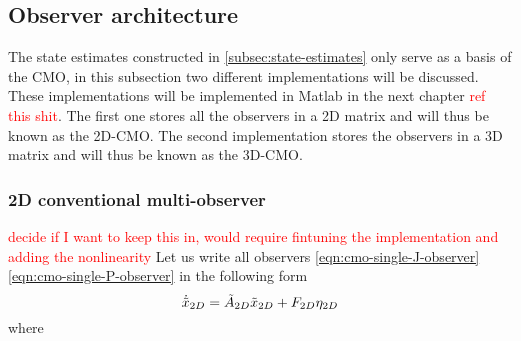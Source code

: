 \subsection{Observer architecture}\label{subsec:CMO-architecture}
The state estimates constructed in \ref{subsec:state-estimates} only serve as a basis of the CMO, in this subsection two different implementations will be discussed. These implementations will be implemented in Matlab in the next chapter \textcolor{red}{ref this shit}. The first one  stores all the observers in a 2D matrix and will thus be known as the 2D-CMO. The second implementation stores the observers in a 3D matrix and will thus be known as the 3D-CMO.

\subsubsection{2D conventional multi-observer}
\textcolor{red}{decide if I want to keep this in, would require fintuning the implementation and adding the nonlinearity}
Let us write all observers \eqref{eqn:cmo-single-J-observer}\eqref{eqn:cmo-single-P-observer} in the following form
\begin{equation*}
    \dot{\Tilde{x}}_{2D} = \Tilde{A}_{2D}\Tilde{x}_{2D} + F_{2D}\eta_{2D}
\end{equation*}
where
